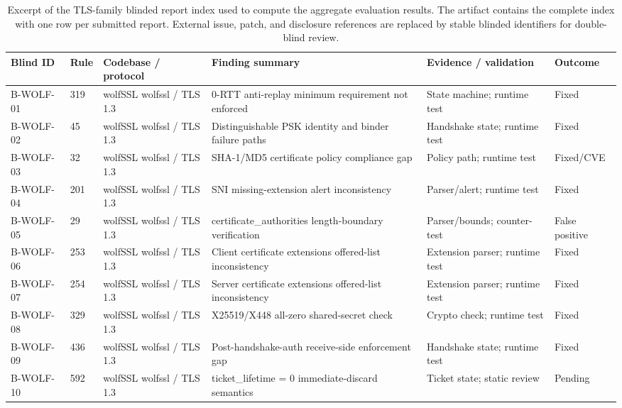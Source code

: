 \begin{table}[p]
\centering
\caption{Excerpt of the TLS-family blinded report index used to compute the
aggregate evaluation results. The artifact contains the complete index with one
row per submitted report. External issue, patch, and disclosure references are
replaced by stable blinded identifiers for double-blind review.}
\label{tab:sample-report-index-tls}
\footnotesize
\renewcommand{\arraystretch}{1.05}
\setlength{\tabcolsep}{2.0pt}
\begin{tabular}{p{}p{}p{}p{}p{}p{}}
\toprule
\textbf{Blind ID} & \textbf{Rule} & \textbf{Codebase / protocol} & \textbf{Finding summary} & \textbf{Evidence / validation} & \textbf{Outcome} \\
\midrule
B-WOLF-01 & 319 & wolfSSL wolfssl / TLS 1.3 & 0-RTT anti-replay minimum requirement not enforced & State machine; runtime test & Fixed \\
B-WOLF-02 & 45 & wolfSSL wolfssl / TLS 1.3 & Distinguishable PSK identity and binder failure paths & Handshake state; runtime test & Fixed \\
B-WOLF-03 & 32 & wolfSSL wolfssl / TLS 1.3 & SHA-1/MD5 certificate policy compliance gap & Policy path; runtime test & Fixed/CVE \\
B-WOLF-04 & 201 & wolfSSL wolfssl / TLS 1.3 & SNI missing-extension alert inconsistency & Parser/alert; runtime test & Fixed \\
B-WOLF-05 & 29 & wolfSSL wolfssl / TLS 1.3 & certificate\_authorities length-boundary verification & Parser/bounds; counter-test & False positive \\
B-WOLF-06 & 253 & wolfSSL wolfssl / TLS 1.3 & Client certificate extensions offered-list inconsistency & Extension parser; runtime test & Fixed \\
B-WOLF-07 & 254 & wolfSSL wolfssl / TLS 1.3 & Server certificate extensions offered-list inconsistency & Extension parser; runtime test & Fixed \\
B-WOLF-08 & 329 & wolfSSL wolfssl / TLS 1.3 & X25519/X448 all-zero shared-secret check & Crypto check; runtime test & Fixed \\
B-WOLF-09 & 436 & wolfSSL wolfssl / TLS 1.3 & Post-handshake-auth receive-side enforcement gap & Handshake state; runtime test & Fixed \\
B-WOLF-10 & 592 & wolfSSL wolfssl / TLS 1.3 & ticket\_lifetime = 0 immediate-discard semantics & Ticket state; static review & Pending \\

\end{tabular}
\end{table}
